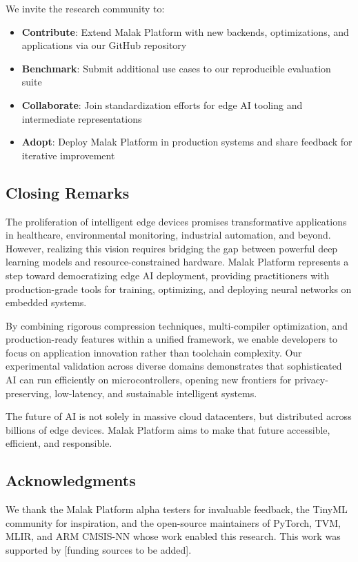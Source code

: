 We invite the research community to:
\begin{itemize}
\item \textbf{Contribute}: Extend Malak Platform with new backends, optimizations, and applications via our GitHub repository
\item \textbf{Benchmark}: Submit additional use cases to our reproducible evaluation suite
\item \textbf{Collaborate}: Join standardization efforts for edge AI tooling and intermediate representations
\item \textbf{Adopt}: Deploy Malak Platform in production systems and share feedback for iterative improvement
\end{itemize}

\subsection{Closing Remarks}

The proliferation of intelligent edge devices promises transformative applications in healthcare, environmental monitoring, industrial automation, and beyond. However, realizing this vision requires bridging the gap between powerful deep learning models and resource-constrained hardware. Malak Platform represents a step toward democratizing edge AI deployment, providing practitioners with production-grade tools for training, optimizing, and deploying neural networks on embedded systems.

By combining rigorous compression techniques, multi-compiler optimization, and production-ready features within a unified framework, we enable developers to focus on application innovation rather than toolchain complexity. Our experimental validation across diverse domains demonstrates that sophisticated AI can run efficiently on microcontrollers, opening new frontiers for privacy-preserving, low-latency, and sustainable intelligent systems.

The future of AI is not solely in massive cloud datacenters, but distributed across billions of edge devices. Malak Platform aims to make that future accessible, efficient, and responsible.

\subsection*{Acknowledgments}

We thank the Malak Platform alpha testers for invaluable feedback, the TinyML community for inspiration, and the open-source maintainers of PyTorch, TVM, MLIR, and ARM CMSIS-NN whose work enabled this research. This work was supported by [funding sources to be added].

